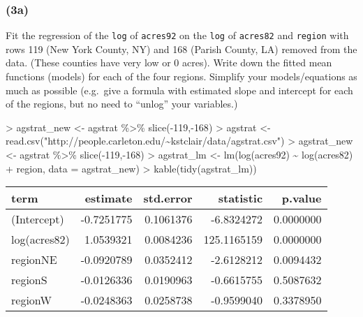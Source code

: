 \documentclass[
]{article}
\newenvironment{Shaded}{\begin{snugshade}}{\end{snugshade}}
\newcommand{\AttributeTok}[1]{\textcolor[rgb]{0.77,0.63,0.00}{#1}}
\newcommand{\DecValTok}[1]{\textcolor[rgb]{0.00,0.00,0.81}{#1}}
\newcommand{\FunctionTok}[1]{\textcolor[rgb]{0.00,0.00,0.00}{#1}}
\newcommand{\NormalTok}[1]{#1}
\newcommand{\OtherTok}[1]{\textcolor[rgb]{0.56,0.35,0.01}{#1}}
\newcommand{\SpecialCharTok}[1]{\textcolor[rgb]{0.00,0.00,0.00}{#1}}
\newcommand{\StringTok}[1]{\textcolor[rgb]{0.31,0.60,0.02}{#1}}
\begin{document}
\hypertarget{a-1}{%
\subsubsection{(3a)}\label{a-1}}

Fit the regression of the \texttt{log} of \texttt{acres92} on the
\texttt{log} of \texttt{acres82} and \texttt{region} with rows 119 (New
York County, NY) and 168 (Parish County, LA) removed from the data.
(These counties have very low or 0 acres). Write down the fitted mean
functions (models) for each of the four regions. Simplify your
models/equations as much as possible (e.g.~give a formula with estimated
slope and intercept for each of the regions, but no need to ``unlog''
your variables.)

\begin{Shaded}
\begin{Highlighting}[]
\SpecialCharTok{\textgreater{}}\NormalTok{ agstrat\_new }\OtherTok{\textless{}{-}}\NormalTok{ agstrat }\SpecialCharTok{\%\textgreater{}\%} \FunctionTok{slice}\NormalTok{(}\SpecialCharTok{{-}}\DecValTok{119}\NormalTok{,}\SpecialCharTok{{-}}\DecValTok{168}\NormalTok{)}
\SpecialCharTok{\textgreater{}}\NormalTok{ agstrat }\OtherTok{\textless{}{-}} \FunctionTok{read.csv}\NormalTok{(}\StringTok{"http://people.carleton.edu/\textasciitilde{}kstclair/data/agstrat.csv"}\NormalTok{)}
\SpecialCharTok{\textgreater{}}\NormalTok{ agstrat\_new }\OtherTok{\textless{}{-}}\NormalTok{ agstrat }\SpecialCharTok{\%\textgreater{}\%} \FunctionTok{slice}\NormalTok{(}\SpecialCharTok{{-}}\DecValTok{119}\NormalTok{,}\SpecialCharTok{{-}}\DecValTok{168}\NormalTok{)}
\SpecialCharTok{\textgreater{}}\NormalTok{ agstrat\_lm }\OtherTok{\textless{}{-}} \FunctionTok{lm}\NormalTok{(}\FunctionTok{log}\NormalTok{(acres92) }\SpecialCharTok{\textasciitilde{}} \FunctionTok{log}\NormalTok{(acres82) }\SpecialCharTok{+}\NormalTok{ region, }\AttributeTok{data =}\NormalTok{ agstrat\_new)}
\SpecialCharTok{\textgreater{}} \FunctionTok{kable}\NormalTok{(}\FunctionTok{tidy}\NormalTok{(agstrat\_lm))}
\end{Highlighting}
\end{Shaded}

\begin{longtable}[]{@{}lrrrr@{}}
\toprule
term & estimate & std.error & statistic & p.value \\
\midrule
\endhead
(Intercept) & -0.7251775 & 0.1061376 & -6.8324272 & 0.0000000 \\
log(acres82) & 1.0539321 & 0.0084236 & 125.1165159 & 0.0000000 \\
regionNE & -0.0920789 & 0.0352412 & -2.6128212 & 0.0094432 \\
regionS & -0.0126336 & 0.0190963 & -0.6615755 & 0.5087632 \\
regionW & -0.0248363 & 0.0258738 & -0.9599040 & 0.3378950 \\
\bottomrule
\end{longtable}
\end{document}
